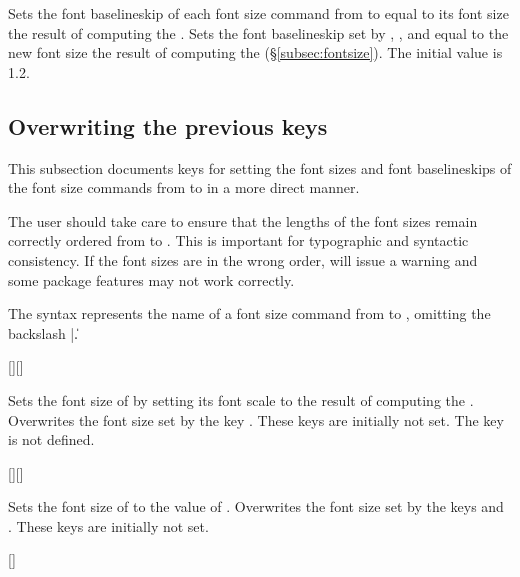 \documentclass{beery}
\begin{document}
Sets the font baselineskip of each font size command from  to  equal to its font size \texttimes{} the result of computing the .
Sets the font baselineskip set by , , and  equal to the new font size \texttimes{} the result of computing the  (\S\ref{subsec:fontsize}).
The initial value is \num{1.2}.

\subsection{Overwriting the previous keys}
\label{subsec:overwriting}

This subsection documents keys for setting the font sizes and font baselineskips of the font size commands from  to  in a more direct manner.

The user should take care to ensure that the lengths of the font sizes remain correctly ordered from  to .
This is important for typographic and syntactic consistency.
If the font sizes are in the wrong order,  will issue a warning and some package features may not work correctly.

The syntax  represents the name of a font size command from  to , omitting the backslash |\|.
\pagebreak%

\begin{displaycode}
  [][]
\end{displaycode}

Sets the font size of  by setting its font scale to the result of computing the .
Overwrites the font size set by the key .
These keys are initially not set.
The key  is not defined.

\begin{displaycode}
  [][]
\end{displaycode}

Sets the font size of  to the value of .
Overwrites the font size set by the keys  and .
These keys are initially not set.

\begin{displaycode}
  []
\end{displaycode}
\end{document}
